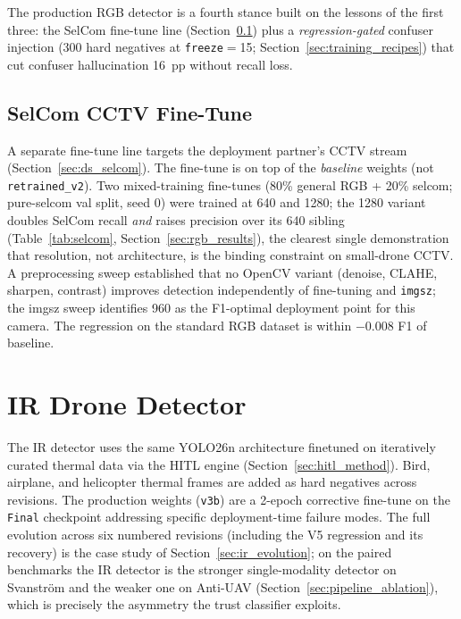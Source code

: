 The production RGB detector is a fourth stance built on the lessons of the first three: the SelCom fine-tune line (Section~\ref{sec:selcom_finetune}) plus a \emph{regression-gated} confuser injection (300 hard negatives at \texttt{freeze}$=$15; Section~\ref{sec:training_recipes}) that cut confuser hallucination 16~pp without recall loss.

\subsection{SelCom CCTV Fine-Tune}
\label{sec:selcom_finetune}

A separate fine-tune line targets the deployment partner's CCTV stream (Section~\ref{sec:ds_selcom}). The fine-tune is on top of the \emph{baseline} weights (not \texttt{retrained\_v2}). Two mixed-training fine-tunes (80\% general RGB + 20\% selcom; pure-selcom val split, seed 0) were trained at 640 and 1280; the 1280 variant doubles SelCom recall \emph{and} raises precision over its 640 sibling (Table~\ref{tab:selcom}, Section~\ref{sec:rgb_results}), the clearest single demonstration that resolution, not architecture, is the binding constraint on small-drone CCTV. A preprocessing sweep established that no OpenCV variant (denoise, CLAHE, sharpen, contrast) improves detection independently of fine-tuning and \texttt{imgsz}; the imgsz sweep identifies 960 as the F1-optimal deployment point for this camera. The regression on the standard RGB dataset is within $-0.008$ F1 of baseline.

\section{IR Drone Detector}
\label{sec:ir_detector}

The IR detector uses the same YOLO26n architecture finetuned on iteratively curated thermal data via the HITL engine (Section~\ref{sec:hitl_method}). Bird, airplane, and helicopter thermal frames are added as hard negatives across revisions. The production weights (\texttt{v3b}) are a 2-epoch corrective fine-tune on the \texttt{Final} checkpoint addressing specific deployment-time failure modes. The full evolution across six numbered revisions (including the V5 regression and its recovery) is the case study of Section~\ref{sec:ir_evolution}; on the paired benchmarks the IR detector is the stronger single-modality detector on Svanstr\"om and the weaker one on Anti-UAV (Section~\ref{sec:pipeline_ablation}), which is precisely the asymmetry the trust classifier exploits.

